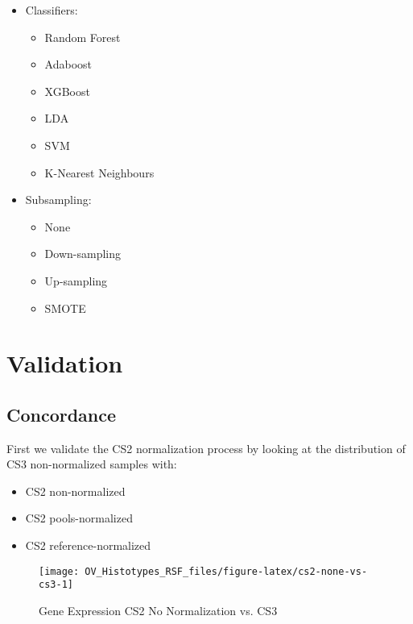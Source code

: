 \documentclass[
]{report}
\providecommand{\tightlist}{%
  \setlength{\itemsep}{0pt}\setlength{\parskip}{0pt}}
\begin{document}
\begin{itemize}
\tightlist
\item
  Classifiers:

  \begin{itemize}
  \tightlist
  \item
    Random Forest
  \item
    Adaboost
  \item
    XGBoost
  \item
    LDA
  \item
    SVM
  \item
    K-Nearest Neighbours
  \end{itemize}
\item
  Subsampling:

  \begin{itemize}
  \tightlist
  \item
    None
  \item
    Down-sampling
  \item
    Up-sampling
  \item
    SMOTE
  \end{itemize}
\end{itemize}

\hypertarget{validation}{%
\chapter{Validation}\label{validation}}

\hypertarget{concordance}{%
\section{Concordance}\label{concordance}}

First we validate the CS2 normalization process by looking at the distribution of CS3 non-normalized samples with:

\begin{itemize}
\tightlist
\item
  CS2 non-normalized
\item
  CS2 pools-normalized
\item
  CS2 reference-normalized
\end{itemize}

\begin{figure}[H]

{\centering \texttt{[image: OV\_Histotypes\_RSF\_files/figure-latex/cs2-none-vs-cs3-1]} 

}

\caption{Gene Expression CS2 No Normalization vs. CS3}\label{fig:cs2-none-vs-cs3}
\end{figure}
\end{document}
